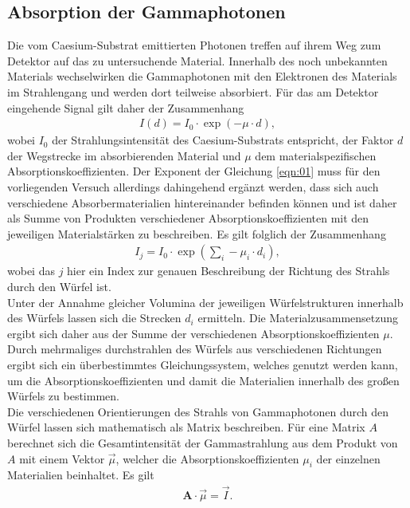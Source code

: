 \subsection{Absorption der Gammaphotonen}
Die vom Caesium-Substrat emittierten Photonen treffen auf ihrem Weg zum Detektor
auf das zu untersuchende Material. Innerhalb des noch unbekannten Materials
wechselwirken die Gammaphotonen mit den Elektronen des Materials im Strahlengang
und werden dort teilweise absorbiert. Für das am Detektor eingehende Signal gilt
daher der Zusammenhang
\begin{align}
  I(d) = I_0 \cdot \exp{(- \mu \cdot d)},
  \label{eqn:01}
\end{align}
wobei $I_0$ der Strahlungsintensität des Caesium-Substrats entspricht, der
Faktor $d$ der Wegstrecke im absorbierenden Material und $\mu$ dem
materialspezifischen Absorptionskoeffizienten. Der Exponent der Gleichung
\ref{eqn:01} muss für den vorliegenden Versuch allerdings dahingehend ergänzt
werden, dass sich auch verschiedene Absorbermaterialien hintereinander befinden
können und ist daher als Summe von Produkten verschiedener
Absorptionskoeffizienten mit den jeweiligen Materialstärken zu beschreiben. Es
gilt folglich der Zusammenhang
\begin{align}
  I_j = I_0 \cdot \exp{\left(\sum_{i} - \mu_i \cdot d_i \right)},
  \label{eqn:02}
\end{align}
\noindent wobei das $j$ hier ein Index zur genauen Beschreibung der Richtung des
Strahls durch den Würfel ist. \\
\noindent Unter der Annahme gleicher Volumina der jeweiligen Würfelstrukturen
innerhalb des Würfels lassen sich die Strecken $d_i$ ermitteln. Die
Materialzusammensetzung ergibt sich daher aus der Summe der
verschiedenen Absorptionskoeffizienten $\mu$. Durch mehrmaliges durchstrahlen
des Würfels aus verschiedenen Richtungen ergibt sich ein überbestimmtes
Gleichungssystem, welches genutzt werden kann, um die Absorptionskoeffizienten
und damit die Materialien innerhalb des großen Würfels zu bestimmen. \\
\noindent Die verschiedenen Orientierungen des Strahls von Gammaphotonen durch
den Würfel lassen sich mathematisch als Matrix beschreiben. Für eine Matrix $A$
berechnet sich die Gesamtintensität der Gammastrahlung aus dem Produkt von $A$
mit einem Vektor $\vec{\mu}$, welcher die Absorptionskoeffizienten $\mu_i$ der
einzelnen Materialien beinhaltet. Es gilt
\begin{align}
  \textbf{A} \cdot \vec{\mu} = \vec{I}.
  \label{eqn:03}
\end{align}
